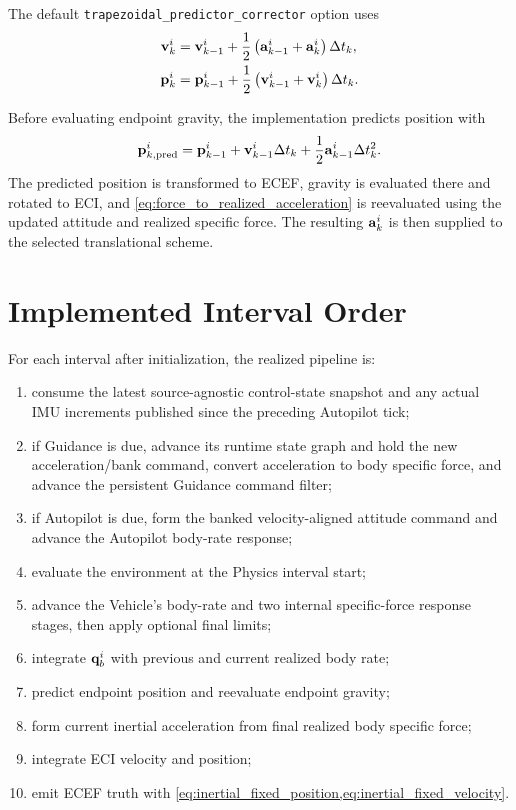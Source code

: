 The default \texttt{trapezoidal\_predictor\_corrector} option uses
\begin{align}
\mathbf{v}_k^{i}
&=
\mathbf{v}_{k-1}^{i}
+
\frac{1}{2}
\left(
\mathbf{a}_{k-1}^{i}+\mathbf{a}_k^{i}
\right)\Delta t_k,
\label{eq:trapezoidal_velocity}\\
\mathbf{p}_k^{i}
&=
\mathbf{p}_{k-1}^{i}
+
\frac{1}{2}
\left(
\mathbf{v}_{k-1}^{i}+\mathbf{v}_k^{i}
\right)\Delta t_k.
\label{eq:trapezoidal_position}
\end{align}

Before evaluating endpoint gravity, the implementation predicts position with
\begin{equation}
\mathbf{p}_{k,\mathrm{pred}}^{i}
=
\mathbf{p}_{k-1}^{i}
+
\mathbf{v}_{k-1}^{i}\Delta t_k
+
\frac{1}{2}\mathbf{a}_{k-1}^{i}\Delta t_k^2.
\label{eq:endpoint_position_predictor}
\end{equation}
The predicted position is transformed to ECEF, gravity is evaluated there and
rotated to ECI, and \cref{eq:force_to_realized_acceleration} is reevaluated using the
updated attitude and realized specific force. The resulting $\mathbf{a}_k^{i}$ is
then supplied to the selected translational scheme.

\section{Implemented Interval Order}

For each interval after initialization, the realized pipeline is:
\begin{enumerate}
    \item consume the latest source-agnostic control-state snapshot and any
          actual IMU increments published since the preceding Autopilot tick;
    \item if Guidance is due, advance its runtime state graph and hold the new
          acceleration/bank command, convert acceleration to body specific
          force, and advance the persistent Guidance command filter;
    \item if Autopilot is due, form the banked velocity-aligned attitude
          command and advance the Autopilot body-rate response;
    \item evaluate the environment at the Physics interval start;
    \item advance the Vehicle's body-rate and two internal specific-force
          response stages, then apply optional final limits;
    \item integrate $\mathbf{q}_b^i$ with previous and current realized body rate;
    \item predict endpoint position and reevaluate endpoint gravity;
    \item form current inertial acceleration from final realized body specific
          force;
    \item integrate ECI velocity and position;
    \item emit ECEF truth with
          \cref{eq:inertial_fixed_position,eq:inertial_fixed_velocity}.
\end{enumerate}

